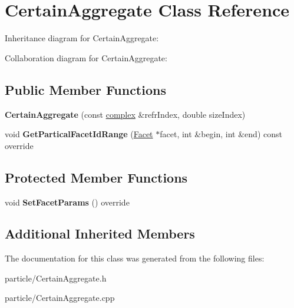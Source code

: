 \hypertarget{class_certain_aggregate}{}\section{Certain\+Aggregate Class Reference}
\label{class_certain_aggregate}


Inheritance diagram for Certain\+Aggregate\+:


Collaboration diagram for Certain\+Aggregate\+:
\subsection*{Public Member Functions}
\begin{DoxyCompactItemize}
\item 
\mbox{\label{class_certain_aggregate_a8f2bd1d6a7c1f20e937ff8f0e42dc7c7}} 
{\bfseries Certain\+Aggregate} (const \mbox{\hyperlink{classcomplex}{complex}} \&refr\+Index, double size\+Index)
\item 
\mbox{\label{class_certain_aggregate_a9278fd4dd43852adc4e400fa4be6316e}} 
void {\bfseries Get\+Partical\+Facet\+Id\+Range} (\mbox{\hyperlink{class_facet}{Facet}} $\ast$facet, int \&begin, int \&end) const override
\end{DoxyCompactItemize}
\subsection*{Protected Member Functions}
\begin{DoxyCompactItemize}
\item 
\mbox{\label{class_certain_aggregate_aa67b3812d8a84ad79bbcef90ac6bbe00}} 
void {\bfseries Set\+Facet\+Params} () override
\end{DoxyCompactItemize}
\subsection*{Additional Inherited Members}


The documentation for this class was generated from the following files\+:\begin{DoxyCompactItemize}
\item 
particle/Certain\+Aggregate.\+h\item 
particle/Certain\+Aggregate.\+cpp\end{DoxyCompactItemize}

